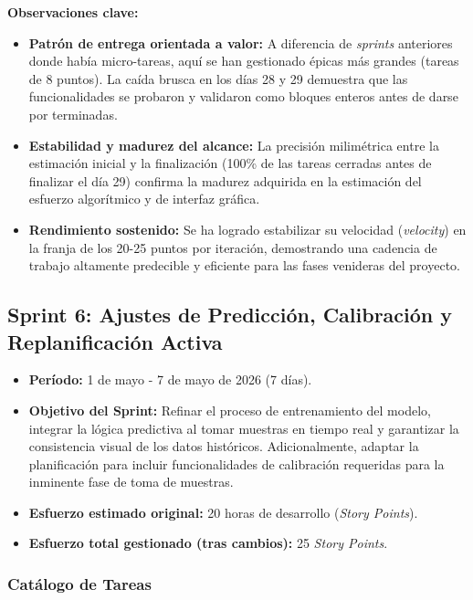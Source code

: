 \noindent\textbf{Observaciones clave:}
\begin{itemize}
    \item \textbf{Patrón de entrega orientada a valor:} A diferencia de \textit{sprints} anteriores donde había micro-tareas, aquí se han gestionado épicas más grandes (tareas de 8 puntos). La caída brusca en los días 28 y 29 demuestra que las funcionalidades se probaron y validaron como bloques enteros antes de darse por terminadas.
    \item \textbf{Estabilidad y madurez del alcance:} La precisión milimétrica entre la estimación inicial y la finalización (100\% de las tareas cerradas antes de finalizar el día 29) confirma la madurez adquirida en la estimación del esfuerzo algorítmico y de interfaz gráfica.
    \item \textbf{Rendimiento sostenido:} Se ha logrado estabilizar su velocidad (\textit{velocity}) en la franja de los 20-25 puntos por iteración, demostrando una cadencia de trabajo altamente predecible y eficiente para las fases venideras del proyecto.
\end{itemize}

\subsection{Sprint 6: Ajustes de Predicción, Calibración y Replanificación Activa}

\begin{itemize}
    \item \textbf{Período:} 1 de mayo - 7 de mayo de 2026 (7 días).
    \item \textbf{Objetivo del Sprint:} Refinar el proceso de entrenamiento del modelo, integrar la lógica predictiva al tomar muestras en tiempo real y garantizar la consistencia visual de los datos históricos. Adicionalmente, adaptar la planificación para incluir funcionalidades de calibración requeridas para la inminente fase de toma de muestras.
    \item \textbf{Esfuerzo estimado original:} 20 horas de desarrollo (\textit{Story Points}).
    \item \textbf{Esfuerzo total gestionado (tras cambios):} 25 \textit{Story Points}.
\end{itemize}

\subsubsection{Catálogo de Tareas}


